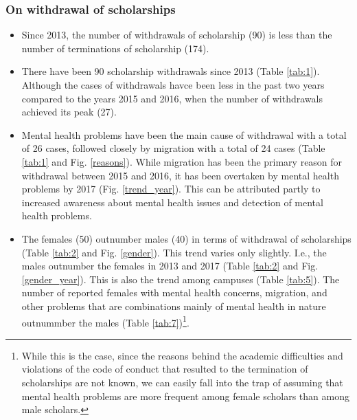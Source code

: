 \documentclass[a4paper]{article}
\providecommand{\tightlist}{%
  \setlength{\itemsep}{0pt}\setlength{\parskip}{0pt}}
\let\rmarkdownfootnote\footnote%
\def\footnote{\protect\rmarkdownfootnote}
\begin{document}
\hypertarget{on-withdrawal-of-scholarships}{%
\subsubsection{On withdrawal of
scholarships}\label{on-withdrawal-of-scholarships}}

\begin{itemize}
\tightlist
\item
  Since 2013, the number of withdrawals of scholarship (90) is less than
  the number of terminations of scholarship (174).
\item
  There have been 90 scholarship withdrawals since 2013 (Table
  \ref{tab:1}). Although the cases of withdrawals havce been less in the
  past two years compared to the years 2015 and 2016, when the number of
  withdrawals achieved its peak (27).
\item
  Mental health problems have been the main cause of withdrawal with a
  total of 26 cases, followed closely by migration with a total of 24
  cases (Table \ref{tab:1} and Fig. \ref{reasons}). While migration has
  been the primary reason for withdrawal between 2015 and 2016, it has
  been overtaken by mental health problems by 2017 (Fig.
  \ref{trend_year}). This can be attributed partly to increased
  awareness about mental health issues and detection of mental health
  problems.
\item
  The females (50) outnumber males (40) in terms of withdrawal of
  scholarships (Table \ref{tab:2} and Fig. \ref{gender}). This trend
  varies only slightly. I.e., the males outnumber the females in 2013
  and 2017 (Table \ref{tab:2} and Fig. \ref{gender_year}). This is also
  the trend among campuses (Table \ref{tab:5}). The number of reported
  females with mental health concerns, migration, and other problems
  that are combinations mainly of mental health in nature outnummber the
  males (Table \ref{tab:7})\footnote{While this is the case, since the
    reasons behind the academic difficulties and violations of the code
    of conduct that resulted to the termination of scholarships are not
    known, we can easily fall into the trap of assuming that mental
    health problems are more frequent among female scholars than among
    male scholars.}.
\end{itemize}
\end{document}
